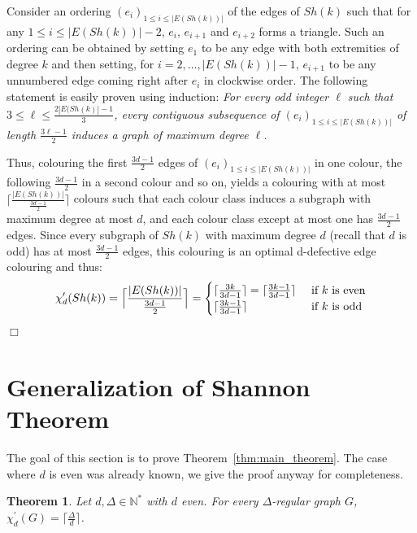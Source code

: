\documentclass[11pt]{article}
\newtheorem{theorem}[lemma]{Theorem}
\newcounter{claim}
\newenvironment{proof}[1][]%
 {\noindent {\setcounter{claim}{0}\sc proof ---
   }{#1}{}}{\hfill$\Box$\vspace{2ex}}
\begin{document}
\begin{proof}
Consider an ordering $(e_i)_{1 \leq i \leq |E(Sh(k))|}$ of the edges of $Sh(k)$ such that for any $1 \leq i \leq |E(Sh(k))| - 2$, $e_i$, $e_{i+1}$ and $e_{i+2}$ forms a triangle. 
Such an ordering can be obtained by setting $e_{1}$ to be any edge with both extremities of degree $k$ and then setting, for $i=2, \dots, |E(Sh(k))| - 1$, $e_{i+1}$ to be any unnumbered edge coming right after $e_{i}$ in clockwise order. 
The following statement is easily proven using induction:
\emph{
    For every odd integer $\ell$ such that $3 \leq \ell \leq \frac{2|E(Sh(k)|-1}{3}$, every contiguous subsequence of $(e_{i})_{1 \leq i \leq |E(Sh(k))|}$ of length $\frac{3\ell - 1}{2}$ induces a graph of maximum degree $\ell$.
}

Thus, colouring the first $\frac{3d-1}{2}$ edges of $(e_i)_{1 \leq i \leq |E(Sh(k))|}$ in one colour, the following $\frac{3d-1}{2}$ in a second colour and so on, yields a colouring with at most $\lceil \frac{|E(Sh(k))|}{\frac{3d-1}{2}} \rceil$ colours such that each colour class induces a subgraph with maximum degree at most $d$, and each colour class except at most one has $\frac{3d-1}{2}$ edges. Since every subgraph of $Sh(k)$ with maximum degree $d$ (recall that $d$ is odd) has at most $\frac{3d-1}{2}$ edges, this colouring is an optimal d-defective edge colouring and thus: 
\[ \chi'_d(Sh(k)) = \Bigl\lceil \frac{|E(Sh(k))|}{\frac{3d-1}{2}} \Bigr\rceil = 
  \begin{cases}
     \lceil \frac{3k}{3d-1} \rceil = \lceil \frac{3k-1}{3d-1} \rceil   & \text{ if } k \text{ is even} \\
     \lceil \frac{3k-1}{3d-1} \rceil & \text{ if } k \text{ is odd}
  \end{cases}
\]
\end{proof}



\section{Generalization of Shannon Theorem} \label{sec:multi}


The goal of this section is to prove Theorem~\ref{thm:main_theorem}. The case where $d$ is even was already known, we give the proof anyway for completeness. 
\begin{theorem}\cite{HILTON2001253, amini:inria-00144318}\label{thm:deven}
Let $d, \Delta \in \mathbb N^*$ with $d$ even. For every $\Delta$-regular graph $G$, $\chi^{'}_{d}(G) = \lceil \frac{\Delta}{d} \rceil$.
\end{theorem}
\end{document}
